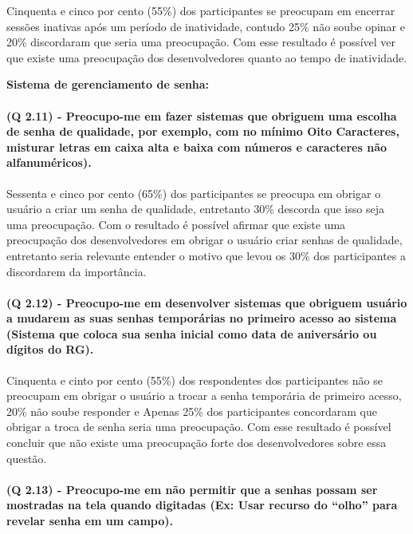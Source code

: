 Cinquenta e cinco por cento (55{\%}) dos participantes se preocupam em encerrar sessões inativas após um período de inatividade, contudo 25{\%} não soube opinar e 20{\%} discordaram que seria uma preocupação. Com esse resultado é possível  ver que existe uma preocupação dos desenvolvedores quanto ao tempo de inatividade.

\vspace{0.5cm}
\noindent\textbf{Sistema de gerenciamento de senha:}
\paragraph{\textbf{(Q 2.11)} - Preocupo-me em fazer sistemas que obriguem uma escolha de senha de qualidade, por exemplo, com no mínimo Oito Caracteres, misturar letras em caixa alta e baixa com números e caracteres não alfanuméricos).}

Sessenta e cinco por cento (65{\%}) dos participantes se preocupa em obrigar o usuário a criar um senha de qualidade, entretanto 30{\%} descorda que  isso seja uma preocupação. Com o resultado é possível afirmar que existe uma preocupação dos desenvolvedores em obrigar o usuário criar senhas de qualidade, entretanto seria relevante entender o motivo que levou os 30{\%} dos participantes a discordarem da importância. 

\paragraph{\textbf{(Q 2.12)} - Preocupo-me em desenvolver sistemas que obriguem usuário a mudarem as suas senhas temporárias no primeiro acesso ao sistema (Sistema que coloca sua senha inicial como data de aniversário ou dígitos do RG).}

Cinquenta e cinto por cento (55{\%}) dos respondentes dos participantes não se preocupam em obrigar o usuário a trocar a senha temporária de primeiro acesso, 20{\%} não soube responder e Apenas 25{\%} dos participantes concordaram que obrigar a troca de senha seria uma preocupação. Com esse resultado é possível concluir que não existe uma preocupação forte dos desenvolvedores sobre essa questão.

\paragraph{\textbf{(Q 2.13)} - Preocupo-me em não permitir que a senhas possam ser mostradas na tela quando digitadas (Ex: Usar recurso do “olho” para revelar senha em um campo).}

